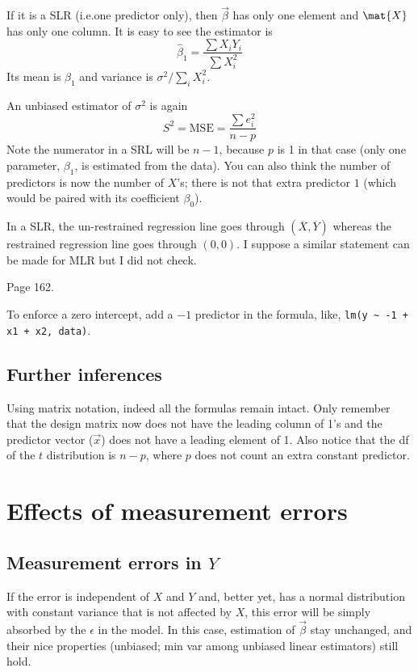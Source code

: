 \documentclass[12pt]{article}
\begin{document}
If it is a SLR (i.e.\@ one predictor only),
then $\vec{\beta}$ has only one element and $\mat{X}$ has only one
column.
It is easy to see the estimator is
\[
\hat{\beta}_1 = \frac{\sum X_iY_i}{\sum X_i^2}
\]
Its mean is $\beta_1$ and variance is
$\sigma^2/\sum_i X_i^2$.


An unbiased estimator of $\sigma^2$ is again
\[
S^2 = \text{MSE} = \frac{\sum e_i^2}{n-p}
\]
Note the numerator in a SRL will be $n-1$,
because $p$ is 1 in that case
(only one parameter, $\beta_1$, is estimated from the data).
You can also think the number of predictors is now
the number of $X$'s; there is not that extra predictor $1$
(which would be paired with its coefficient $\beta_0$).

In a SLR,
the un-restrained regression line goes through
$(\overline{X}, \overline{Y})$ whereas the restrained regression line
goes through $(0, 0)$.
I suppose a similar statement can be made for MLR but I did not check.

\example Page 162.

\alert[\texttt{R} tip]%
To enforce a zero intercept,
add a $-1$ predictor in the formula, like,
\verb^lm(y ~ -1 + x1 + x2, data)^.

\subsection{Further inferences}

Using matrix notation, indeed all the formulas remain intact.
Only remember that the design matrix now does not have the leading
column of 1's and the predictor vector ($\vec{x}$) does not have a
leading element of 1.
Also notice that the df of the $t$ distribution is $n - p$,
where $p$ does not count an extra constant predictor.


\section{Effects of measurement errors}

\subsection{Measurement errors in $Y$}

If the error is independent of $X$ and $Y$
and, better yet, has a normal distribution with constant variance that
is not affected by $X$, this error will be simply absorbed by the
$\epsilon$ in the model.
In this case,
estimation of $\vec\beta$ stay unchanged,
and their nice properties (unbiased; min var among unbiased linear
estimators) still hold.
\end{document}
